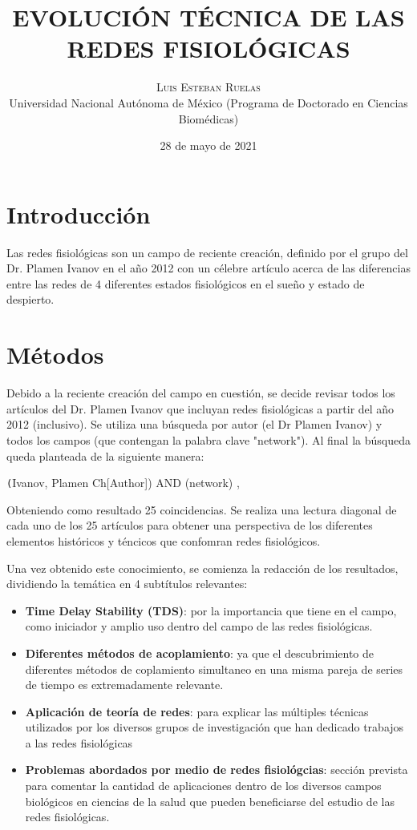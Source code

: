 \documentclass[twoside,twocolumn]{article}
\title{EVOLUCIÓN TÉCNICA DE LAS REDES FISIOLÓGICAS} %
\author{%
\textsc{Luis Esteban Ruelas} \\[1ex] %
\normalsize Universidad Nacional Autónoma de México
 (Programa de Doctorado en Ciencias Biomédicas)\\ %
}
\date{28 de mayo de 2021} %
\begin{document}
\renewcommand{\abstractname}{Resumen}
\maketitle


\section{Introducción}
Las redes fisiológicas son un campo de reciente creación, definido por el grupo del Dr. Plamen Ivanov en el año 2012 con un célebre artículo acerca de las diferencias entre las redes de 4 diferentes estados fisiológicos en el sueño y estado de despierto\cite{bartsch2014coexisting}.


\section{Métodos}
Debido a la reciente creación del campo en cuestión, se decide revisar todos los artículos del Dr. Plamen Ivanov que incluyan redes fisiológicas a partir del año 2012 (inclusivo).
Se utiliza una búsqueda por autor (el Dr Plamen Ivanov) y todos los campos (que contengan la palabra clave "network"). Al final la búsqueda queda planteada de la siguiente manera:

\texttt(Ivanov, Plamen Ch[Author]) AND (network) ,

Obteniendo como resultado 25 coincidencias. Se realiza una lectura diagonal de cada uno de los 25 artículos para obtener una perspectiva de los diferentes elementos históricos y téncicos que confomran redes fisiológicos.

Una vez obtenido este conocimiento, se comienza la redacción de los resultados, dividiendo la temática en 4 subtítulos relevantes:
\begin{itemize}
  \item \textbf{Time Delay Stability (TDS)}: por la importancia que tiene en el campo, como iniciador y amplio uso dentro del campo de las redes fisiológicas.
  \item \textbf{Diferentes métodos de acoplamiento}: ya que el descubrimiento de diferentes métodos de coplamiento simultaneo en una misma pareja de series de tiempo es extremadamente relevante.
  \item \textbf{Aplicación de teoría de redes}: para explicar las múltiples técnicas utilizados por los diversos grupos de investigación que han dedicado trabajos a las redes fisiológicas
  \item \textbf{Problemas abordados por medio de redes fisiológcias}: sección prevista para comentar la cantidad de aplicaciones dentro de los diversos campos biológicos en ciencias de la salud que pueden beneficiarse del estudio de las redes fisiológicas.
\end{itemize}
\end{document}
